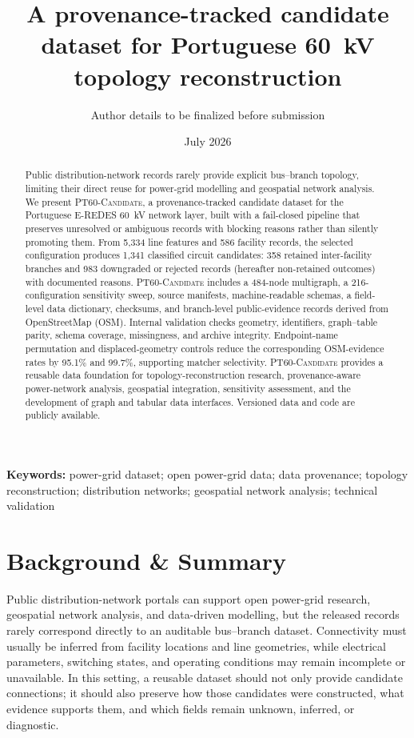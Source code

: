 \documentclass[10pt]{article}
\title{A provenance-tracked candidate dataset for Portuguese 60~kV topology reconstruction}
\author[1]{Author details to be finalized before submission}
\affil[1]{Affiliation details to be finalized before submission}
\date{July 2026}
\newcommand{\dataset}{\textsc{PT60-Candidate}\xspace}
\begin{document}
\maketitle

\begin{abstract}
Public distribution-network records rarely provide explicit bus--branch topology, limiting their direct reuse for power-grid modelling and geospatial network analysis. We present \dataset, a provenance-tracked candidate dataset for the Portuguese E-REDES 60~kV network layer, built with a fail-closed pipeline that preserves unresolved or ambiguous records with blocking reasons rather than silently promoting them. From 5,334 line features and 586 facility records, the selected configuration produces 1,341 classified circuit candidates: 358 retained inter-facility branches and 983 downgraded or rejected records (hereafter non-retained outcomes) with documented reasons. \dataset{} includes a 484-node multigraph, a 216-configuration sensitivity sweep, source manifests, machine-readable schemas, a field-level data dictionary, checksums, and branch-level public-evidence records derived from OpenStreetMap (OSM). Internal validation checks geometry, identifiers, graph--table parity, schema coverage, missingness, and archive integrity. Endpoint-name permutation and displaced-geometry controls reduce the corresponding OSM-evidence rates by 95.1\% and 99.7\%, supporting matcher selectivity. \dataset{} provides a reusable data foundation for topology-reconstruction research, provenance-aware power-network analysis, geospatial integration, sensitivity assessment, and the development of graph and tabular data interfaces. Versioned data and code are publicly available.
\end{abstract}

\noindent\textbf{Keywords:} power-grid dataset; open power-grid data; data provenance; topology reconstruction; distribution networks; geospatial network analysis; technical validation

\section{Background \& Summary}

Public distribution-network portals can support open power-grid research, geospatial network analysis, and data-driven modelling, but the released records rarely correspond directly to an auditable bus--branch dataset. Connectivity must usually be inferred from facility locations and line geometries, while electrical parameters, switching states, and operating conditions may remain incomplete or unavailable. In this setting, a reusable dataset should not only provide candidate connections; it should also preserve how those candidates were constructed, what evidence supports them, and which fields remain unknown, inferred, or diagnostic.
\end{document}
